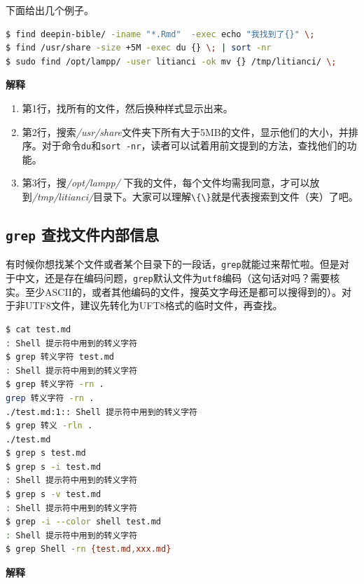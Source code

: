 \documentclass[doctor,openright,twoside]{sjtuthesis}
\providecommand{\tightlist}{%
    \setlength{\itemsep}{0pt}\setlength{\parskip}{0pt}}
\newcommand{\passthrough}[1]{#1}
\theoremstyle{plain}
\theoremstyle{definition}
\theoremstyle{remark}
\theoremstyle{ocrenumbox}
\theoremstyle{plain}
\begin{document}
下面给出几个例子。

\begin{lstlisting}[language=bash]
$ find deepin-bible/ -iname "*.Rmd"  -exec echo "我找到了{}" \;
$ find /usr/share -size +5M -exec du {} \; | sort -nr
$ sudo find /opt/lampp/ -user litianci -ok mv {} /tmp/litianci/ \;
\end{lstlisting}

\textbf{解释}

\begin{enumerate}
\def\labelenumi{\arabic{enumi}.}
\tightlist
\item
  第1行，找所有的文件，然后换种样式显示出来。
\item
  第2行，搜索\emph{/usr/share}文件夹下所有大于5MB的文件，显示他们的大小，并排序。对于命令\passthrough{\lstinline!du!}和\passthrough{\lstinline!sort -nr!}，读者可以试着用前文提到的方法，查找他们的功能。
\item
  第3行，搜\emph{/opt/lampp/}
  下我的文件，每个文件均需我同意，才可以放到\emph{/tmp/litianci/}目录下。大家可以理解\passthrough{\lstinline!\{\}!}就是代表搜索到文件（夹）了吧。
\end{enumerate}

\hypertarget{grep-}{%
\subsection{\texorpdfstring{\texttt{grep}
查找文件内部信息}{grep 查找文件内部信息}}\label{grep-}}

有时候你想找某个文件或者某个目录下的一段话，\passthrough{\lstinline!grep!}就能过来帮忙啦。但是对于中文，还是存在编码问题，\passthrough{\lstinline!grep!}默认文件为\passthrough{\lstinline!utf8!}编码（这句话对吗？需要核实。至少ASCII的，或者其他编码的文件，搜英文字母还是都可以搜得到的）。对于非UTF8文件，建议先转化为UFT8格式的临时文件，再查找。

\begin{lstlisting}[language=bash]
$ cat test.md
: Shell 提示符中用到的转义字符
$ grep 转义字符 test.md
: Shell 提示符中用到的转义字符
$ grep 转义字符 -rn .
grep 转义字符 -rn .
./test.md:1:: Shell 提示符中用到的转义字符
$ grep 转义 -rln .
./test.md
$ grep s test.md
$ grep s -i test.md
: Shell 提示符中用到的转义字符
$ grep s -v test.md
: Shell 提示符中用到的转义字符
$ grep -i --color shell test.md
: Shell 提示符中用到的转义字符
$ grep Shell -rn {test.md,xxx.md}
\end{lstlisting}

\textbf{解释}
\end{document}
